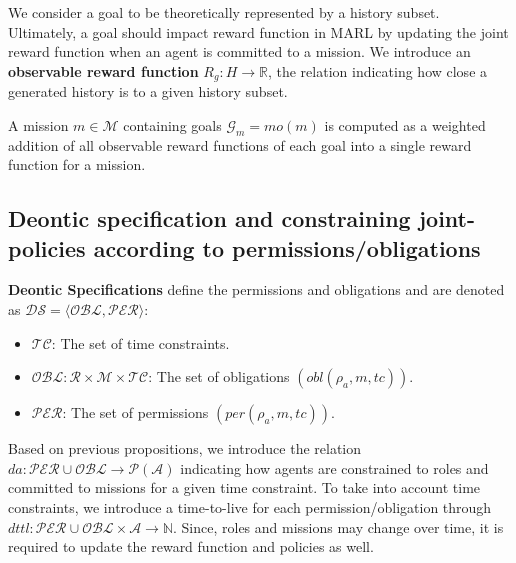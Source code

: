 \documentclass[conference]{IEEEtran}
\newcounter{relation}
\begin{document}
We consider a goal to be theoretically represented by a history subset. Ultimately, a goal should impact reward function in MARL by updating the joint reward function when an agent is committed to a mission. We introduce an \textbf{observable reward function} $R_{g}: H \rightarrow \mathbb{R}$, the relation indicating how close a generated history is to a given history subset.

A mission $m \in \mathcal{M}$ containing goals $\mathcal{G}_{m} = mo(m)$ is computed as a weighted addition of all observable reward functions of each goal into a single reward function for a mission.

%     



\subsection{Deontic specification and constraining joint-policies according to permissions/obligations}

\textbf{Deontic Specifications} define the permissions and obligations and are denoted as $\mathcal{DS} = \langle \mathcal{OBL}, \mathcal{PER} \rangle$:

\begin{itemize}
    \item $\mathcal{TC}$: The set of time constraints.
    \item $\mathcal{OBL}: \mathcal{R} \times \mathcal{M} \times \mathcal{TC}$: The set of obligations $(obl(\rho_a, m, tc))$.
    \item $\mathcal{PER}$: The set of permissions $(per(\rho_a, m, tc))$.
\end{itemize}

Based on previous propositions, we introduce the relation $da: \mathcal{PER} \cup \mathcal{OBL} \rightarrow \mathcal{P}(\mathcal{A})$ indicating how agents are constrained to roles and committed to missions for a given time constraint.
To take into account time constraints, we introduce a time-to-live for each permission/obligation through $dttl: \mathcal{PER} \cup \mathcal{OBL} \times \mathcal{A} \rightarrow \mathbb{N}$. Since, roles and missions may change over time, it is required to update the reward function and policies as well.
\end{document}
